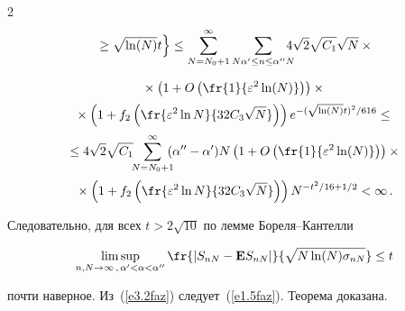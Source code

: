 \begin{multicols}{2}
\begin{multline*}
\left.{}\ge


 \sqrt{\ln(N)}t


\vphantom{\fr{|S_{nN}-{\E}S_{nN}|}{\sqrt{N}\sigma_{nN}}}


\right\}\le


\sum_{N=N_0+1}^{\infty}\sum\limits_{N \alpha'\le n\le


\alpha^{\prime\prime}N}


\!\!\!\!\!4\sqrt{2}\sqrt{C_1}\sqrt{N}\times{}


\end{multline*}


\begin{multline*}


{}\times \left(1+O\left(\fr{1}{\varepsilon^2\ln(N)}\right)


\right)\times{}\\[2pt]


{}\times


\left(1+f_2\left(\fr{\varepsilon^2\ln{N}}{32C_3\sqrt{N}}\right)\right)e^{-{(\sqrt{\ln(N)}t)^2}/616}\le{}\\[2pt]


{}


\le 4\sqrt{2}\sqrt{C_1}\! \!\sum_{N=N_0+1}^{\infty}\!\!\!( \alpha^{\prime\prime}-


\alpha')N\left(1+O\left(\fr{1}{\varepsilon^2\ln(N)}\right) \right)\times{}\\[2pt]


{}\times


\left(1+f_2\left(\fr{\varepsilon^2\ln{N}}{32C_3\sqrt{N}}\right)\right)


N^{-t^2/16+{1}/2}<\infty\,.


 \end{multline*}


 


 \noindent


Следовательно, для всех $t>2\sqrt{10}$  по лемме Бо\-ре\-ля--Кан\-тел\-ли


\begin{equation}


\limsup_{n,N\to\infty\,,\,\alpha'<\alpha<


\alpha^{\prime\prime}}\fr{|S_{nN}-{\E}S_{nN}|}{\sqrt{N\ln(N)\sigma_{nN}}}\le t


\label{e3.2faz}


\end{equation}


почти наверное. Из~(\ref{e3.2faz}) следует~(\ref{e1.5faz}). Теорема доказана.









\end{multicols}
